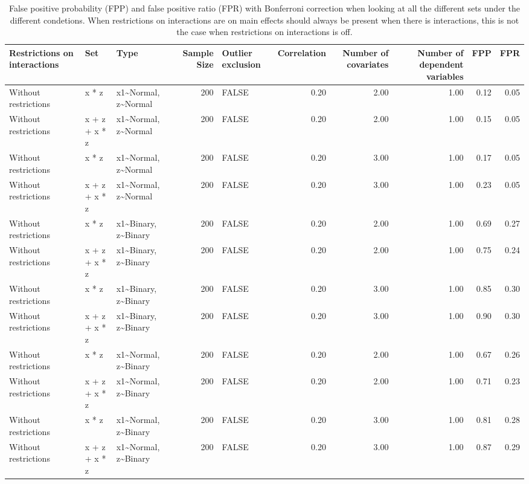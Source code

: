 \begin{longtable}{lllrlrrrrr}
\caption{False positive probability (FPP) and false positive ratio (FPR) with Bonferroni correction when looking at all the different sets under the different condetions. When restrictions on interactions are on main effects should always be present when there is interactions, this is not the case when restrictions on interactions is off.} \\ 
  \hline
Restrictions on interactions & Set & Type & Sample Size & Outlier exclusion & Correlation & Number of covariates & Number of dependent variables & FPP & FPR \\ 
  \hline
Without restrictions & x * z & x1\~{}Normal, z\~{}Normal & 200 & FALSE & 0.20 & 2.00 & 1.00 & 0.12 & 0.05 \\ 
  Without restrictions & x + z + x * z & x1\~{}Normal, z\~{}Normal & 200 & FALSE & 0.20 & 2.00 & 1.00 & 0.15 & 0.05 \\ 
  Without restrictions & x * z & x1\~{}Normal, z\~{}Normal & 200 & FALSE & 0.20 & 3.00 & 1.00 & 0.17 & 0.05 \\ 
  Without restrictions & x + z + x * z & x1\~{}Normal, z\~{}Normal & 200 & FALSE & 0.20 & 3.00 & 1.00 & 0.23 & 0.05 \\ 
  Without restrictions & x * z & x1\~{}Binary, z\~{}Binary & 200 & FALSE & 0.20 & 2.00 & 1.00 & 0.69 & 0.27 \\ 
  Without restrictions & x + z + x * z & x1\~{}Binary, z\~{}Binary & 200 & FALSE & 0.20 & 2.00 & 1.00 & 0.75 & 0.24 \\ 
  Without restrictions & x * z & x1\~{}Binary, z\~{}Binary & 200 & FALSE & 0.20 & 3.00 & 1.00 & 0.85 & 0.30 \\ 
  Without restrictions & x + z + x * z & x1\~{}Binary, z\~{}Binary & 200 & FALSE & 0.20 & 3.00 & 1.00 & 0.90 & 0.30 \\ 
  Without restrictions & x * z & x1\~{}Normal, z\~{}Binary & 200 & FALSE & 0.20 & 2.00 & 1.00 & 0.67 & 0.26 \\ 
  Without restrictions & x + z + x * z & x1\~{}Normal, z\~{}Binary & 200 & FALSE & 0.20 & 2.00 & 1.00 & 0.71 & 0.23 \\ 
  Without restrictions & x * z & x1\~{}Normal, z\~{}Binary & 200 & FALSE & 0.20 & 3.00 & 1.00 & 0.81 & 0.28 \\ 
  Without restrictions & x + z + x * z & x1\~{}Normal, z\~{}Binary & 200 & FALSE & 0.20 & 3.00 & 1.00 & 0.87 & 0.29 \\ 

\end{longtable}
